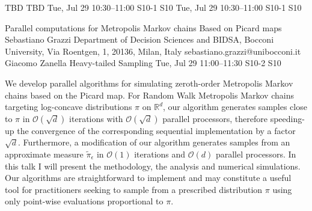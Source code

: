 \begin{talk}
  {TBD}%
  {TBD}%
  {Tue, Jul 29 10:30–11:00}%
  {S10-1}%
  {S10}%
  {}%
  {Tue, Jul 29 10:30–11:00}%
  {S10-1}%
  {S10}%
\end{talk}

\begin{talk}
  {Parallel computations for Metropolis Markov chains Based on Picard maps}%
  {Sebastiano Grazzi}%
  {Department of Decision Sciences and BIDSA, Bocconi University, Via Roentgen, 1, 20136, Milan, Italy}%
  {sebastiano.grazzi@unibocconi.it}%
  {Giacomo Zanella}%
  {Heavy-tailed Sampling}%
  {Tue, Jul 29 11:00–11:30}%
  {S10-2}%
  {S10}%
				
			

 We develop parallel algorithms for simulating zeroth-order Metropolis Markov chains based on the Picard map. 
For Random Walk Metropolis Markov chains targeting log-concave distributions $\pi$ on $\mathbb{R}^d$, our algorithm  
generates samples %
close to $\pi$ %
in $\mathcal{O}(\sqrt{d})$ iterations with $\mathcal{O}(\sqrt{d})$ parallel processors, 
therefore speeding-up the convergence of the corresponding sequential implementation by a factor $\sqrt{d}$. Furthermore, a modification of our algorithm generates samples from an approximate measure $\tilde \pi_\epsilon$ in $\mathcal{O}(1)$ iterations and $\mathcal{O}(d)$ parallel processors. In this talk I will present the methodology, the analysis and numerical simulations. Our algorithms are straightforward to implement and may constitute a useful tool for practitioners seeking to sample from a prescribed distribution $\pi$ using only point-wise evaluations proportional to $\pi$.
\end{talk}


